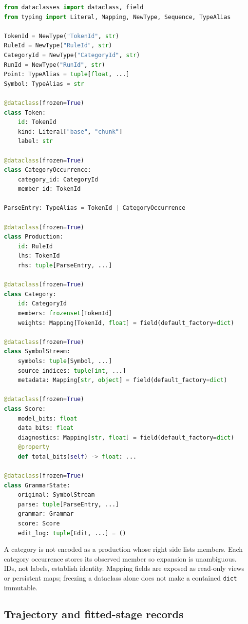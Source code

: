 \documentclass[11pt]{article}
\begin{document}
\begin{lstlisting}[language=Python]
from dataclasses import dataclass, field
from typing import Literal, Mapping, NewType, Sequence, TypeAlias

TokenId = NewType("TokenId", str)
RuleId = NewType("RuleId", str)
CategoryId = NewType("CategoryId", str)
RunId = NewType("RunId", str)
Point: TypeAlias = tuple[float, ...]
Symbol: TypeAlias = str

@dataclass(frozen=True)
class Token:
    id: TokenId
    kind: Literal["base", "chunk"]
    label: str

@dataclass(frozen=True)
class CategoryOccurrence:
    category_id: CategoryId
    member_id: TokenId

ParseEntry: TypeAlias = TokenId | CategoryOccurrence

@dataclass(frozen=True)
class Production:
    id: RuleId
    lhs: TokenId
    rhs: tuple[ParseEntry, ...]

@dataclass(frozen=True)
class Category:
    id: CategoryId
    members: frozenset[TokenId]
    weights: Mapping[TokenId, float] = field(default_factory=dict)

@dataclass(frozen=True)
class SymbolStream:
    symbols: tuple[Symbol, ...]
    source_indices: tuple[int, ...]
    metadata: Mapping[str, object] = field(default_factory=dict)

@dataclass(frozen=True)
class Score:
    model_bits: float
    data_bits: float
    diagnostics: Mapping[str, float] = field(default_factory=dict)
    @property
    def total_bits(self) -> float: ...

@dataclass(frozen=True)
class GrammarState:
    original: SymbolStream
    parse: tuple[ParseEntry, ...]
    grammar: Grammar
    score: Score
    edit_log: tuple[Edit, ...] = ()
\end{lstlisting}

A category is not encoded as a production whose right side lists members. Each
category occurrence stores its observed member so expansion is unambiguous.
IDs, not labels, establish identity. Mapping fields are exposed as read-only
views or persistent maps; freezing a dataclass alone does not make a contained
\texttt{dict} immutable.

\subsection{Trajectory and fitted-stage records}
\end{document}
